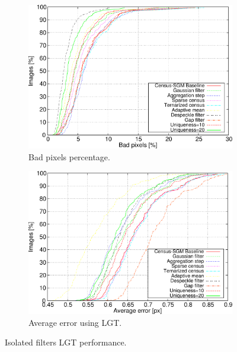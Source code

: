 \begin{figure}
      \centering
      \begin{subfigure}[h]{\textwidth}
	\centering
	\includegraphics[width=\textwidth, trim=0 0 0 0,clip]{filt_bpp}
	
	\caption{ Bad pixels percentage.}
	\label{fig:cp03_isolated_LGT_bpp} 
      \end{subfigure}%
      
      \begin{subfigure}[h]{\textwidth}
	\centering
	\includegraphics[width=\textwidth, trim=0 0 0 0,clip]{filt_avg}
	\caption{ Average error using LGT. }
	\label{fig:cp03_isolated_LGT_avg}
      \end{subfigure}%
      \caption{ Isolated filters LGT performance. }
\end{figure}

